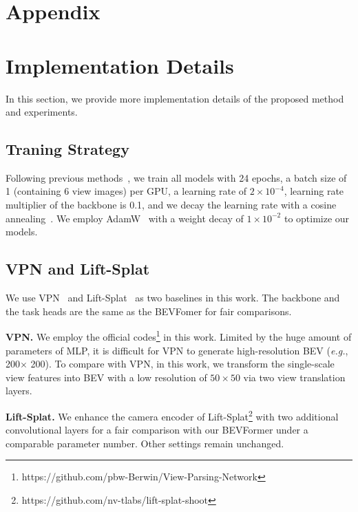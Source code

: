 \documentclass{article}
\def\eg{\emph{e.g.}}
\begin{document}
\section*{Appendix}
\appendix


\section{Implementation Details}
In this section, we provide more implementation details of the proposed method and experiments.

\subsection{Traning Strategy}





Following previous methods~\cite{wang2022detr3d,zhu2020deformable},
we train all models with 24 epochs, a batch size of 1 (containing 6 view images) per GPU, a learning rate of $2\!\times\!10^{-4}$, learning rate multiplier of the backbone is 0.1, and we decay the learning rate with a cosine annealing~\cite{Loshchilov2017SGDRSG}. We employ AdamW~\cite{Loshchilov2019DecoupledWD} with a weight decay of $1\!\times\!10^{-2}$ to optimize our models.

\subsection{VPN and Lift-Splat}
We use VPN~\cite{pan2020cross} and Lift-Splat~\cite{philion2020lift} as two baselines in this work. The backbone and the task heads are the same as the BEVFomer for fair comparisons.

\noindent\textbf{VPN.} We employ the official codes\footnote{https://github.com/pbw-Berwin/View-Parsing-Network} in this work. Limited by the huge amount of parameters of MLP, it is difficult for VPN to generate high-resolution BEV (\eg, 200$\times$ 200).
To compare with VPN, in this work, we transform the single-scale view features into BEV with a low resolution of $50\!\times\!50$ 
via two view translation layers.

\noindent\textbf{Lift-Splat.} We enhance the camera encoder of Lift-Splat\footnote{https://github.com/nv-tlabs/lift-splat-shoot} with two additional convolutional layers for a fair comparison with our BEVFormer under a comparable parameter number. Other settings remain unchanged.
\end{document}
